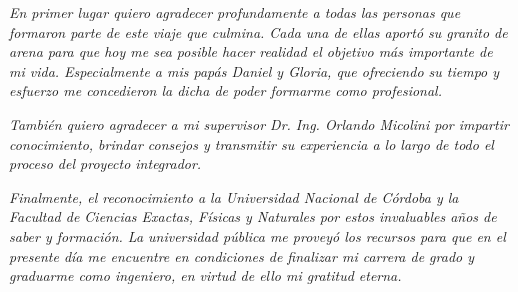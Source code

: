 \documentclass[a4paper,12pt]{article}
\begin{document}
\begin{flushright}
	\textit{En primer lugar quiero agradecer profundamente a todas las personas que formaron parte de este viaje que culmina. Cada una de ellas aportó su granito de arena para que hoy me sea posible hacer realidad el objetivo más importante de mi vida. Especialmente a mis papás Daniel y Gloria, que ofreciendo su tiempo y esfuerzo me concedieron la dicha de poder formarme como profesional.}
\end{flushright}

\begin{flushright}
	\textit{También quiero agradecer a mi supervisor Dr. Ing. Orlando Micolini por impartir conocimiento, brindar consejos y transmitir su experiencia a lo largo de todo el proceso del proyecto integrador.}
\end{flushright}

\begin{flushright}
	\textit{Finalmente, el reconocimiento a la Universidad Nacional de Córdoba y la Facultad de Ciencias Exactas, Físicas y Naturales por estos invaluables años de saber y formación. La universidad pública me proveyó los recursos para que en el presente día me encuentre en condiciones de finalizar mi carrera de grado y graduarme como ingeniero, en virtud de ello mi gratitud eterna.}
\end{flushright}

\vspace*{\fill}

\clearpage

\tableofcontents

\clearpage

%
%
\end{document}
